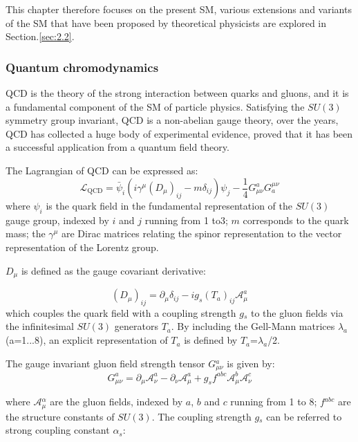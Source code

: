 \documentclass[UTF8,12pt]{ctexart}
\numberwithin{equation}{section}
\begin{document}
This chapter therefore focuses on the present SM, various extensions and variants of the SM that have been proposed by theoretical physicists are explored in Section.\ref{sec:2.2}.

\subsubsection{Quantum chromodynamics}
\label{sec:2.1.1}

QCD is the theory of the strong interaction between quarks and gluons, and it is a fundamental component of the SM of particle physics. Satisfying the $SU(3)$ symmetry group invariant, QCD is a non-abelian gauge theory, over the years, QCD has collected a huge body of experimental evidence, proved that it has been a successful application from a quantum field theory.

The Lagrangian of QCD can be expressed as:
\begin{equation}
\mathcal{L}_{\mathrm{QCD}}=\bar{\psi}_{i}\left(i \gamma^{\mu}\left(D_{\mu}\right)_{i j}-m \delta_{i j}\right) \psi_{j}-\frac{1}{4} G_{\mu \nu}^{a} G_{a}^{\mu \nu}
\end{equation}
where $\psi_{i}$ is the quark field in the fundamental representation of the $SU(3)$ gauge group, indexed by $i$ and $j$ running from 1 to3; $m$ corresponds to the quark mass; the $\gamma^{\mu}$ are Dirac matrices relating the spinor representation to the vector representation of the Lorentz group.

$D$$_{\mu}$ is defined as the gauge covariant derivative:

\begin{equation}
\left(D_{\mu}\right)_{i j}=\partial_{\mu} \delta_{i j}-i g_s\left(T_{a}\right)_{i j} \mathcal{A}_{\mu}^{a}
\end{equation}
which couples the quark field with a coupling strength $g$$_s$ to the gluon fields via the infinitesimal $SU(3)$ generators $T$$_{a}$. By including the Gell-Mann matrices $\lambda _{a}$ (a=1...8), an explicit representation of $T$$_{a}$ is defined by $T$$_{a}$=$\lambda _{a}$/2.

The gauge invariant gluon field strength tensor $G$$_{\mu \nu}^{a}$ is given by:
\begin{equation}
G_{\mu \nu}^{a}=\partial_{\mu} \mathcal{A}_{\nu}^{a}-\partial_{\nu} \mathcal{A}_{\mu}^{a}+g_s f^{a b c} \mathcal{A}_{\mu}^{b} \mathcal{A}_{\nu}^{c}
\end{equation}

where $\mathcal{A}$$_{\mu}^{\alpha}$ are the gluon fields, indexed by $a$, $b$ and $c$ running from 1 to 8; $f$$^{a b c}$ are the structure constants of $SU(3)$. The coupling strength $g$$_s$ can be referred to strong coupling constant $\alpha_{s}$:
\end{document}
